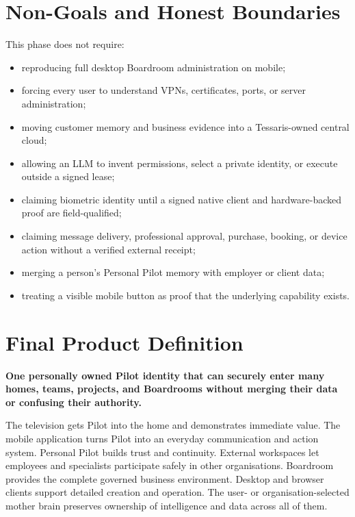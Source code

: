 \documentclass[11pt,a4paper]{article}
\begin{document}
\section{Non-Goals and Honest Boundaries}

This phase does not require:

\begin{itemize}[leftmargin=*]
  \item reproducing full desktop Boardroom administration on mobile;
  \item forcing every user to understand VPNs, certificates, ports, or server administration;
  \item moving customer memory and business evidence into a Tessaris-owned central cloud;
  \item allowing an LLM to invent permissions, select a private identity, or execute outside a signed lease;
  \item claiming biometric identity until a signed native client and hardware-backed proof are field-qualified;
  \item claiming message delivery, professional approval, purchase, booking, or device action without a verified external receipt;
  \item merging a person's Personal Pilot memory with employer or client data;
  \item treating a visible mobile button as proof that the underlying capability exists.
\end{itemize}

\section{Final Product Definition}

\begin{center}
\large\textbf{One personally owned Pilot identity that can securely enter many
homes, teams, projects, and Boardrooms without merging their data or confusing
their authority.}
\end{center}

The television gets Pilot into the home and demonstrates immediate value.  The
mobile application turns Pilot into an everyday communication and action
system.  Personal Pilot builds trust and continuity.  External workspaces let
employees and specialists participate safely in other organisations.
Boardroom provides the complete governed business environment.  Desktop and
browser clients support detailed creation and operation.  The user- or
organisation-selected mother brain preserves ownership of intelligence and
data across all of them.
\end{document}
